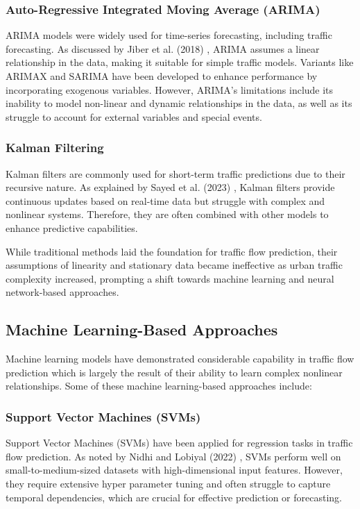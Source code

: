 \documentclass[conference]{IEEEtran}
\begin{document}
\subsubsection{Auto-Regressive Integrated Moving Average (ARIMA)}
ARIMA models were widely used for time-series forecasting, including traffic forecasting. As discussed by Jiber et al. (2018) \cite{same2018}, ARIMA assumes a linear relationship in the data, making it suitable for simple traffic models. Variants like ARIMAX and SARIMA have been developed to enhance performance by incorporating exogenous variables. However, ARIMA's limitations include its inability to model non-linear and dynamic relationships in the data, as well as its struggle to account for external variables and special events.

\subsubsection{Kalman Filtering}
Kalman filters are commonly used for short-term traffic predictions due to their recursive nature. As explained by Sayed et al. (2023) \cite{ppr1}, Kalman filters provide continuous updates based on real-time data but struggle with complex and nonlinear systems. Therefore, they are often combined with other models to enhance predictive capabilities.

While traditional methods laid the foundation for traffic flow prediction, their assumptions of linearity and stationary data became ineffective as urban traffic complexity increased, prompting a shift towards machine learning and neural network-based approaches.

\subsection{Machine Learning-Based Approaches}

Machine learning models have demonstrated considerable capability in traffic flow prediction which is largely the result of their ability to learn complex nonlinear relationships. Some of these machine learning-based approaches include:

\subsubsection{Support Vector Machines (SVMs)}
Support Vector Machines (SVMs) have been applied for regression tasks in traffic flow prediction. As noted by Nidhi and Lobiyal (2022) \cite{ppr4}, SVMs perform well on small-to-medium-sized datasets with high-dimensional input features. However, they require extensive hyper parameter tuning and often struggle to capture temporal dependencies, which are crucial for effective prediction or forecasting.
\end{document}
